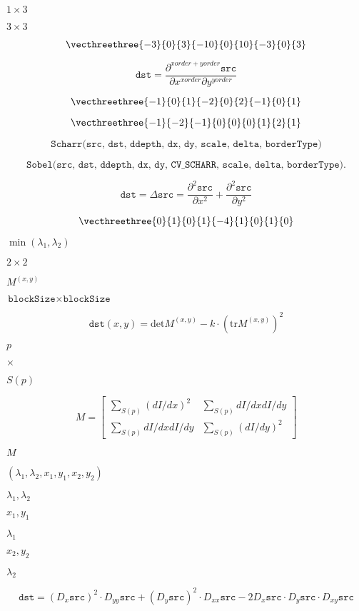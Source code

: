 \documentclass{article}
\begin{document}
$1 \times 3$
\pagebreak

$3\times3$
\pagebreak

\[\vecthreethree{-3}{0}{3}{-10}{0}{10}{-3}{0}{3}\]
\pagebreak

\[\texttt{dst} = \frac{\partial^{xorder+yorder} \texttt{src}}{\partial x^{xorder} \partial y^{yorder}}\]
\pagebreak

\[\vecthreethree{-1}{0}{1}{-2}{0}{2}{-1}{0}{1}\]
\pagebreak

\[\vecthreethree{-1}{-2}{-1}{0}{0}{0}{1}{2}{1}\]
\pagebreak

\[\texttt{Scharr(src, dst, ddepth, dx, dy, scale, delta, borderType)}\]
\pagebreak

\[\texttt{Sobel(src, dst, ddepth, dx, dy, CV\_SCHARR, scale, delta, borderType)} .\]
\pagebreak

\[\texttt{dst} = \Delta \texttt{src} = \frac{\partial^2 \texttt{src}}{\partial x^2} + \frac{\partial^2 \texttt{src}}{\partial y^2}\]
\pagebreak

\[\vecthreethree {0}{1}{0}{1}{-4}{1}{0}{1}{0}\]
\pagebreak

$\min(\lambda_1, \lambda_2)$
\pagebreak

$2\times2$
\pagebreak

$M^{(x,y)}$
\pagebreak

$\texttt{blockSize} \times \texttt{blockSize}$
\pagebreak

\[\texttt{dst} (x,y) = \mathrm{det} M^{(x,y)} - k \cdot \left ( \mathrm{tr} M^{(x,y)} \right )^2\]
\pagebreak

$p$
\pagebreak

$\times$
\pagebreak

$S(p)$
\pagebreak

\[M = \begin{bmatrix} \sum _{S(p)}(dI/dx)^2 & \sum _{S(p)}dI/dx dI/dy \\ \sum _{S(p)}dI/dx dI/dy & \sum _{S(p)}(dI/dy)^2 \end{bmatrix}\]
\pagebreak

$M$
\pagebreak

$(\lambda_1, \lambda_2, x_1, y_1, x_2, y_2)$
\pagebreak

$\lambda_1, \lambda_2$
\pagebreak

$x_1, y_1$
\pagebreak

$\lambda_1$
\pagebreak

$x_2, y_2$
\pagebreak

$\lambda_2$
\pagebreak

\[\texttt{dst} = (D_x \texttt{src} )^2 \cdot D_{yy} \texttt{src} + (D_y \texttt{src} )^2 \cdot D_{xx} \texttt{src} - 2 D_x \texttt{src} \cdot D_y \texttt{src} \cdot D_{xy} \texttt{src}\]
\pagebreak
\end{document}

